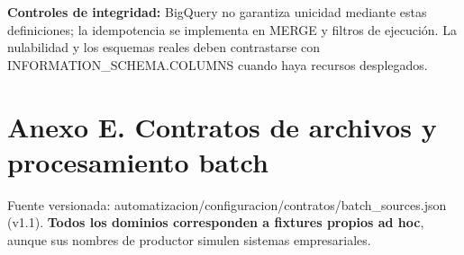 \documentclass[11pt]{article}
\begin{document}
\textbf{Controles de integridad:} BigQuery no garantiza unicidad mediante estas definiciones; la idempotencia se implementa en MERGE y filtros de ejecución. La nulabilidad y los esquemas reales deben contrastarse con INFORMATION\_\allowbreak{}SCHEMA.COLUMNS cuando haya recursos desplegados.\par




\clearpage
\section*{Anexo E. Contratos de archivos y procesamiento batch}

Fuente versionada: automatizacion/\allowbreak{}configuracion/\allowbreak{}contratos/\allowbreak{}batch\_\allowbreak{}sources.json (v1.1). \textbf{Todos los dominios corresponden a fixtures propios ad hoc}, aunque sus nombres de productor simulen sistemas empresariales.\par
\end{document}
